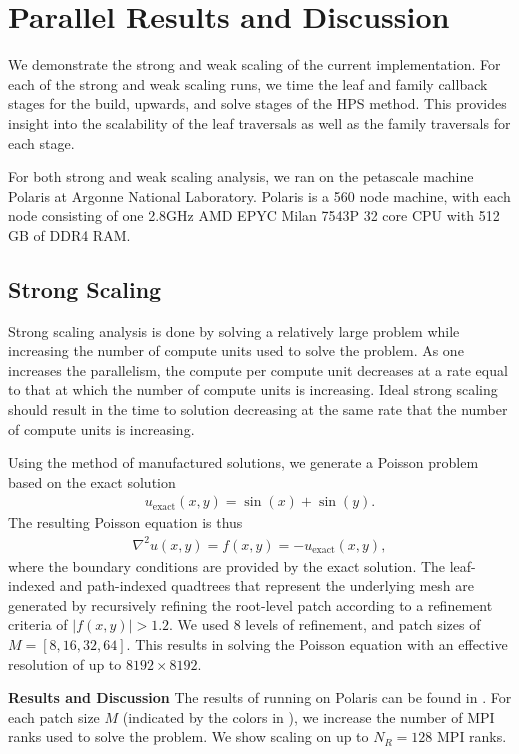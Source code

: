 \section{Parallel Results and Discussion}
\label{sec:parallel-results-and-discussion}

We demonstrate the strong and weak scaling of the current implementation. For each of the strong and weak scaling runs, we time the leaf and family callback stages for the build, upwards, and solve stages of the HPS method. This provides insight into the scalability of the leaf traversals as well as the family traversals for each stage.

For both strong and weak scaling analysis, we ran on the petascale machine Polaris at Argonne National Laboratory. Polaris is a 560 node machine, with each node consisting of one 2.8GHz AMD EPYC Milan 7543P 32 core CPU with 512 GB of DDR4 RAM.

\subsection{Strong Scaling}

Strong scaling analysis is done by solving a relatively large problem while increasing the number of compute units used to solve the problem. As one increases the parallelism, the compute per compute unit decreases at a rate equal to that at which the number of compute units is increasing. Ideal strong scaling should result in the time to solution decreasing at the same rate that the number of compute units is increasing.

Using the method of manufactured solutions, we generate a Poisson problem based on the exact solution
\begin{align}
    u_{\text{exact}}(x, y) = \sin(x) + \sin(y).
\end{align}
The resulting Poisson equation is thus
\begin{align}
    \nabla^2 u(x,y) = f(x,y) = -u_{\text{exact}}(x, y),
\end{align}
where the boundary conditions are provided by the exact solution. The leaf-indexed and path-indexed quadtrees that represent the underlying mesh are generated by recursively refining the root-level patch according to a refinement criteria of $|f(x,y)| > 1.2$. We used 8 levels of refinement, and patch sizes of $M = [8, 16, 32, 64]$. This results in solving the Poisson equation with an effective resolution of up to $8192 \times 8192$.

{\bf Results and Discussion}
The results of running on Polaris can be found in . For each patch size $M$ (indicated by the colors in ), we increase the number of MPI ranks used to solve the problem. We show scaling on up to $N_R = 128$ MPI ranks.

